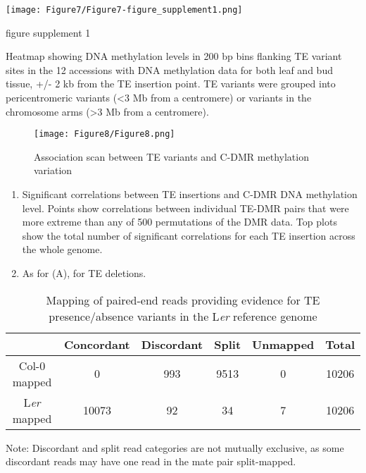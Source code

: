 \documentclass[12pt]{article}
\begin{document}
\pagebreak


\setcounter{suppfigure}{6}

\begin{suppfigure}
  \centering
  \texttt{[image: Figure7/Figure7-figure\_supplement1.png]}
  \caption{figure supplement 1}
  \label{fig7s1}
\end{suppfigure}

Heatmap showing DNA methylation levels in 200 bp bins flanking TE
variant sites in the 12 accessions with DNA methylation data for both
leaf and bud tissue, +/- 2 kb from the TE insertion point. TE variants
were grouped into pericentromeric variants (\textless{}3 Mb from a
centromere) or variants in the chromosome arms (\textgreater{}3 Mb from
a centromere).

\pagebreak


\begin{figure}[!ht]
  \centering
  \texttt{[image: Figure8/Figure8.png]}
  \caption{Association scan between TE variants and C-DMR methylation variation}
  \label{fig8}
\end{figure}

\begin{enumerate}
\def\labelenumi{(\Alph{enumi})}
\item
  Significant correlations between TE insertions and C-DMR DNA
  methylation level. Points show correlations between individual TE-DMR
  pairs that were more extreme than any of 500 permutations of the DMR
  data. Top plots show the total number of significant correlations for
  each TE insertion across the whole genome.
\item
  As for (A), for TE deletions.
\end{enumerate}

\pagebreak

\begin{table}[h]
  \centering
  \begin{threeparttable}
    \caption{Mapping of paired-end reads providing evidence for TE presence/absence
      variants in the L\emph{er} reference genome}
    \label{table1}
    \begin{tabular}{@{}cccccc@{}}
      \toprule
      \textbf{}  & \textbf{Concordant} & \textbf{Discordant} & \textbf{Split} & \textbf{Unmapped} & \textbf{Total} \\ \midrule
      Col-0 mapped & 0 & 993 & 9513 & 0 & 10206 \\
      L\emph{er} mapped & 10073 & 92 & 34 & 7 & 10206 \\ \bottomrule
    \end{tabular}
    \begin{tablenotes}
      \small
    \item Note: Discordant and split read categories are not mutually exclusive, as some discordant reads may have one read in the mate pair split-mapped.
    \end{tablenotes}
  \end{threeparttable}
\end{table}
\end{document}

